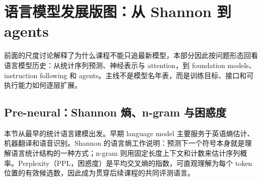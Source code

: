 \documentclass[a4paper]{article}
\begin{document}
\section{语言模型发展版图：从 Shannon 到 agents}

前面的尺度讨论解释了为什么课程不能只追最新模型，本部分因此按问题形态回看语言模型历史：从统计序列预测、神经表示与 attention，到 foundation models、instruction following 和 agents。主线不是模型名年表，而是训练目标、接口和可执行能力如何逐层扩展。

\subsection{Pre-neural：Shannon 熵、n-gram 与困惑度}

本节从最早的统计语言建模出发。早期 language model 主要服务于英语熵估计、机器翻译和语音识别。Shannon 的语言熵工作说明：预测下一个符号本身就是理解语言统计结构的一种方式；n-gram 则用固定长度上下文和计数来估计序列概率。Perplexity（PPL，困惑度）是平均交叉熵的指数，可直观理解为每个 token 位置的有效候选数，因此成为贯穿后续课程的共同评测语言。
\end{document}
